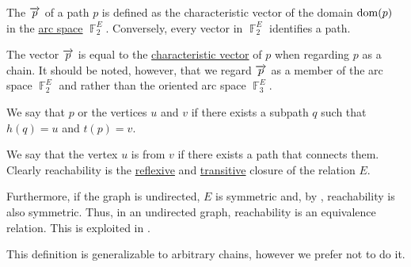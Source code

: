 \begin{definition}
\begin{thmenum}
     The  \( \overrightarrow{p} \) of a path \( p \) is defined as the characteristic vector of the domain \( \operatorname{dom}(p) \) in the \hyperref[def:graph_spaces/arc]{arc space} \( \BbbF_2^E \). Conversely, every vector in \( \BbbF_2^E \) identifies a path.

    The vector \( \overrightarrow{p} \) is equal to the \hyperref[def:graph_adjacency_chain/characteristic_vector]{characteristic vector} of \( p \) when regarding \( p \) as a chain. It should be noted, however, that we regard \( \overrightarrow{p} \) as a member of the arc space \( \BbbF_2^E \) and rather than the oriented arc space \( \BbbF_3^E \).

     We say that \( p \)  or  the vertices \( u \) and \( v \) if there exists a subpath \( q \) such that \( h(q) = u \) and \( t(p) = v \).

    We say that the vertex \( u \) is  from \( v \) if there exists a path that connects them. Clearly reachability is the \hyperref[def:relation_closures/reflexive]{reflexive} and \hyperref[def:relation_closures/transitive]{transitive} closure of the relation \( E \).

    Furthermore, if the graph is undirected, \( E \) is symmetric and, by , reachability is also symmetric. Thus, in an undirected graph, reachability is an equivalence relation. This is exploited in .

    This definition is generalizable to arbitrary chains, however we prefer not to do it.
  \end{thmenum}
\end{definition}

